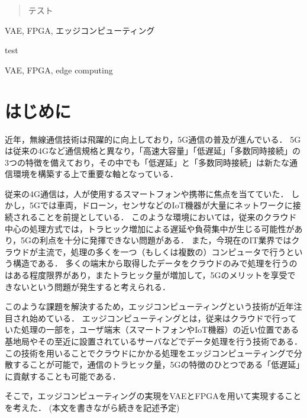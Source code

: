 \documentclass[paper]{ieicej}
\begin{document}
\begin{abstract}
テスト
\end{abstract}
\begin{keyword}
VAE, FPGA, エッジコンピューティング
\end{keyword}
\begin{eabstract}
test
\end{eabstract}
\begin{ekeyword}
VAE, FPGA, edge computing
\end{ekeyword}
\maketitle

\section{はじめに}
近年，無線通信技術は飛躍的に向上しており，5G通信の普及が進んでいる．
5Gは従来の4Gなど通信規格と異なり，「高速大容量」「低遅延」「多数同時接続」の3つの特徴を備えており，その中でも「低遅延」と「多数同時接続」は新たな通信環境を構築する上で重要な軸となっている\cite{5g}．

従来の4G通信は，人が使用するスマートフォンや携帯に焦点を当てていた．
しかし，5Gでは車両，ドローン，センサなどのIoT機器が大量にネットワークに接続されることを前提としている．
このような環境においては，従来のクラウド中心の処理方式では，トラヒック増加による遅延や負荷集中が生じる可能性があり，5Gの利点を十分に発揮できない問題がある．
また，今現在のIT業界ではクラウドが主流で，処理の多くを一つ（もしくは複数の）コンピュータで行うという構造である．
多くの端末から取得したデータをクラウドのみで処理を行うのはある程度限界があり，またトラヒック量が増加して，5Gのメリットを享受できないという問題が発生すると考えられる．

このような課題を解決するため，エッジコンピューティングという技術が近年注目され始めている．
エッジコンピューティングとは，従来はクラウドで行っていた処理の一部を，ユーザ端末（スマートフォンやIoT機器）の近い位置である基地局やその至近に設置されているサーバなどでデータ処理を行う技術である\cite{edge-com}．
この技術を用いることでクラウドにかかる処理をエッジコンピューティングで分散することが可能で，通信のトラヒック量，5Gの特徴のひとつである「低遅延」に貢献することも可能である．

そこで，エッジコンピューティングの実現をVAEとFPGAを用いて実現することを考えた．
(本文を書きながら続きを記述予定)
\end{document}
